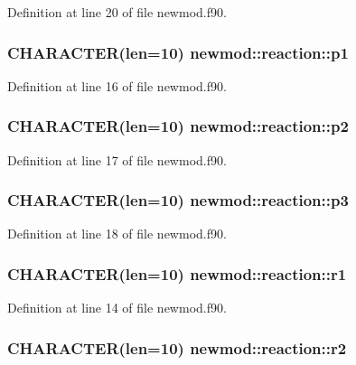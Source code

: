 Definition at line 20 of file newmod.f90.\hypertarget{typenewmod_1_1reaction_a4e8c48adbc8bcd0f6dcf2b23563b0362}{
\subsubsection[{p1}]{\setlength{\rightskip}{0pt plus 5cm}CHARACTER(len=10) {\bf newmod::reaction::p1}}}
\label{typenewmod_1_1reaction_a4e8c48adbc8bcd0f6dcf2b23563b0362}


Definition at line 16 of file newmod.f90.\hypertarget{typenewmod_1_1reaction_ac4e06907f97d8957951ef75a26eefe9e}{
\subsubsection[{p2}]{\setlength{\rightskip}{0pt plus 5cm}CHARACTER(len=10) {\bf newmod::reaction::p2}}}
\label{typenewmod_1_1reaction_ac4e06907f97d8957951ef75a26eefe9e}


Definition at line 17 of file newmod.f90.\hypertarget{typenewmod_1_1reaction_a1807db38c60194498e3c737b8ab9be4f}{
\subsubsection[{p3}]{\setlength{\rightskip}{0pt plus 5cm}CHARACTER(len=10) {\bf newmod::reaction::p3}}}
\label{typenewmod_1_1reaction_a1807db38c60194498e3c737b8ab9be4f}


Definition at line 18 of file newmod.f90.\hypertarget{typenewmod_1_1reaction_aae7e300f8eaae407a7014ac8b372b1c7}{
\subsubsection[{r1}]{\setlength{\rightskip}{0pt plus 5cm}CHARACTER(len=10) {\bf newmod::reaction::r1}}}
\label{typenewmod_1_1reaction_aae7e300f8eaae407a7014ac8b372b1c7}


Definition at line 14 of file newmod.f90.\hypertarget{typenewmod_1_1reaction_accae03e9bc217f2ae538c96f1b303f27}{
\subsubsection[{r2}]{\setlength{\rightskip}{0pt plus 5cm}CHARACTER(len=10) {\bf newmod::reaction::r2}}}
\label{typenewmod_1_1reaction_accae03e9bc217f2ae538c96f1b303f27}


